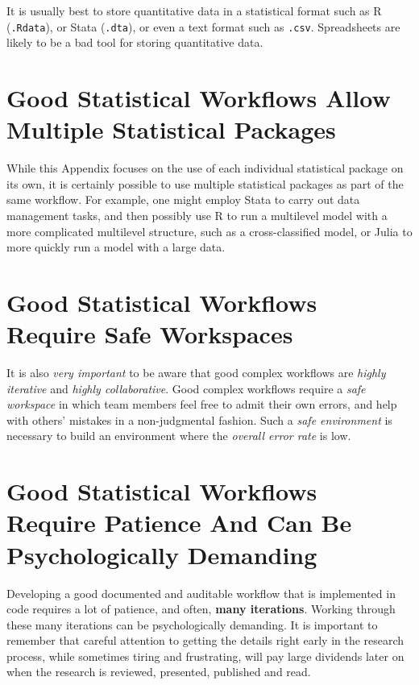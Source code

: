 \documentclass[
  letterpaper,
  DIV=11,
  numbers=noendperiod]{scrreprt}
\begin{document}
It is usually best to store quantitative data in a statistical format
such as R (\texttt{.Rdata}), or Stata (\texttt{.dta}), or even a text
format such as \texttt{.csv}. Spreadsheets are likely to be a bad tool
for storing quantitative data.

\section{Good Statistical Workflows Allow Multiple Statistical
Packages}\label{sec-multiple-packages}

While this Appendix focuses on the use of each individual statistical
package on its own, it is certainly possible to use multiple statistical
packages as part of the same workflow. For example, one might employ
Stata to carry out data management tasks, and then possibly use R to run
a multilevel model with a more complicated multilevel structure, such as
a cross-classified model, or Julia to more quickly run a model with a
large data.

\section{Good Statistical Workflows Require Safe
Workspaces}\label{good-statistical-workflows-require-safe-workspaces}

It is also \emph{very important} to be aware that good complex workflows
are \emph{highly iterative} and \emph{highly collaborative}. Good
complex workflows require a \emph{safe workspace} in which team members
feel free to admit their own errors, and help with others' mistakes in a
non-judgmental fashion. Such a \emph{safe environment} is necessary to
build an environment where the \emph{overall error rate} is low.

\section{Good Statistical Workflows Require Patience And Can Be
Psychologically
Demanding}\label{good-statistical-workflows-require-patience-and-can-be-psychologically-demanding}

Developing a good documented and auditable workflow that is implemented
in code requires a lot of patience, and often, \textbf{many iterations}.
Working through these many iterations can be psychologically demanding.
It is important to remember that careful attention to getting the
details right early in the research process, while sometimes tiring and
frustrating, will pay large dividends later on when the research is
reviewed, presented, published and read.
\end{document}
